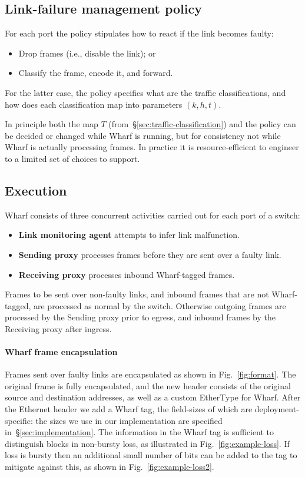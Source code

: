 \documentclass[sigconf]{acmart}
\newcommand{\OurSys}{Wharf\xspace}
\begin{document}
\subsection{Link-failure management policy}
\label{sec:policy}
For each port the policy stipulates how to react if the link becomes faulty:
  \begin{itemize}
    \item Drop frames (i.e., disable the link); or
    \item Classify the frame, encode it, and forward.
  \end{itemize}
For the latter case, the policy specifies what are the traffic classifications,
and how does each classification map into parameters $(k, h, t)$.

In principle both the map $T$ (from~\S\ref{sec:traffic-classification}) and
the policy can be decided or changed while \OurSys is running, but for
consistency not while \OurSys is actually processing frames. In practice it is
resource-efficient to engineer to a limited set of choices to support.


\subsection{Execution}
\OurSys consists of three concurrent activities carried out for each port of a
switch:
\begin{itemize}
  \item \textbf{Link monitoring agent} attempts to infer link malfunction.
  \item \textbf{Sending proxy} processes frames before they are sent over a faulty link.
  \item \textbf{Receiving proxy} processes inbound \OurSys-tagged frames.
\end{itemize}

Frames to be sent over non-faulty links, and inbound frames that are not
\OurSys-tagged, are processed as normal by the switch. Otherwise outgoing frames
are processed by the Sending proxy prior to egress, and inbound frames by
the Receiving proxy after ingress.

\paragraph{\OurSys frame encapsulation}
Frames sent over faulty links are encapsulated as shown in Fig.~\ref{fig:format}.
The original frame is fully encapsulated, and the new header consists of the original source and destination addresses, as well as a custom EtherType for \OurSys.
After the Ethernet header we add a \OurSys tag, the field-sizes of which
are deployment-specific: the sizes we use in our implementation are specified
in~\S\ref{sec:implementation}.
The information in the \OurSys tag is sufficient to distinguish blocks in
non-bursty loss, as illustrated in Fig.~\ref{fig:example-loss}. If loss is
bursty then an additional small number of bits can be added to the tag to
mitigate against this, as shown in Fig.~\ref{fig:example-loss2}.
\end{document}
